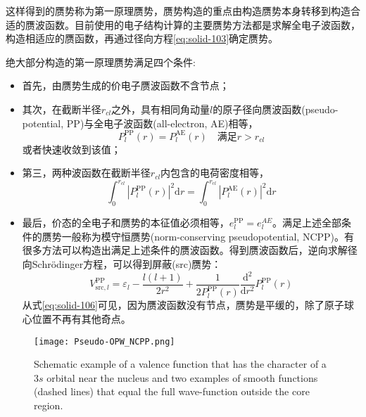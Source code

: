 这样得到的赝势称为第一原理赝势，赝势构造的重点由构造赝势本身转移到构造合适的赝波函数。目前使用的电子结构计算的主要赝势方法都是求解全电子波函数，构造相适应的赝函数，再通过径向方程\eqref{eq:solid-103}确定赝势。

绝大部分构造的第一原理赝势满足四个条件\cite{PRB12-4200_1975,PRB18-5449_1978,PRB19-568_1979,PRB20-4082_1979,PRB26-4199_1982,PRL43-1494_1979,JPC13-L189_1980,PRB32-8412_1985,PRB43-1993_1991}:
\begin{itemize}
	\item 首先，由赝势生成的价电子赝波函数不含节点；
	\item 其次，在截断半径$r_{cl}$之外\cite{JPC13-L189_1980,PRB43-1993_1991}，具有相同角动量$l$的原子径向赝波函数(pseudo-potential, PP)与全电子波函数(all-electron, AE)相等，%
\begin{equation}
	P_l^{\mathrm{PP}}(r)=P_l^{\mathrm{AE}}(r)\quad \mbox{满足}r>r_{cl}
  \label{eq:solid-104}
\end{equation}
或者快速收敛到该值\cite{PRB18-5449_1978,PRL43-1494_1979,PRB32-8412_1985}；
	\item 第三，两种波函数在截断半径$r_{cl}$内包含的电荷密度相等\cite{PRL43-1494_1979,PRB43-1993_1991}，
\begin{equation}
	\int_0^{r_{cl}}|P_l^{\mathrm{PP}}(r)|^2\mathrm{d}r=\int_0^{r_{cl}}|P_l^{\mathrm{AE}}(r)|^2\mathrm{d}r
  \label{eq:solid-105}
\end{equation}
	\item 最后，价态的全电子和赝势的本征值必须相等，$e_l^{\mathrm{PP}}=e_l^{AE}$。满足上述全部条件的赝势一般称为模守恒赝势(norm-conserving pseudopotential, NCPP)\cite{PRL43-1494_1979}。有很多方法可以构造出满足上述条件的赝波函数\cite{PRB18-5449_1978,PRB26-4199_1982,PRL43-1494_1979,JPC13-L189_1980,PRB32-8412_1985,PRB43-1993_1991}。得到赝波函数后，逆向求解径向Schr\"odinger方程，可以得到屏蔽(src)赝势：
\begin{equation}
	V_{\mathrm{src},l}^{\mathrm{PP}}=\varepsilon_l-\frac{l(l+1)}{2r^2}+\frac1{2P_l^{\mathrm{PP}}(r)}\frac{\mathrm{d}^2}{\mathrm{d}r^2}P_l^{\mathrm{PP}}(r)
  \label{eq:solid-106}
\end{equation}
从式\eqref{eq:solid-106}可见，因为赝波函数没有节点，赝势是平缓的，除了原子球心位置不再有其他奇点。
\end{itemize}
\begin{figure}[h!]
\centering
\vspace*{-0.10in}
\texttt{[image: Pseudo-OPW\_NCPP.png]}
\caption{\small \textrm{Schematic example of a valence function that has the character of a $3s$ orbital near the nucleus and two examples of smooth functions (dashed lines) that equal the full wave-function outside the core region.}}%
\label{Pseudo-OPW_NCPP}
\end{figure}
